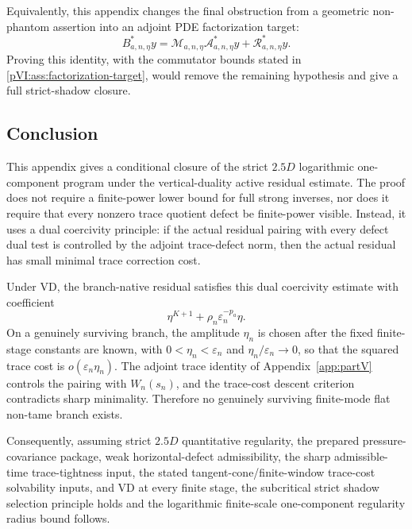 \documentclass[11pt]{article}
\numberwithin{equation}{section}
\theoremstyle{plain}
\theoremstyle{definition}
\theoremstyle{remark}
\newcommand{\eps}{\varepsilon}
\newcommand{\calA}{\mathcal A}
\newcommand{\calM}{\mathcal M}
\newcommand{\calR}{\mathcal R}
\begin{document}
Equivalently, this appendix changes the final obstruction from a geometric non-phantom assertion into
an adjoint PDE factorization target:
\[
        B_{a,n,\eta}^*y
        =
        \calM_{a,n,\eta}\calA_{a,n,\eta}^*y
        +
        \calR_{a,n,\eta}^*y.
\]
Proving this identity, with the commutator bounds stated in \cref{pVI:ass:factorization-target}, would
remove the remaining hypothesis and give a full strict-shadow closure.

\subsection{Conclusion}

This appendix gives a conditional closure of the strict \(2.5D\) logarithmic one-component program under
the vertical-duality active residual estimate.  The proof does not require a finite-power lower bound
for full strong inverses, nor does it require that every nonzero trace quotient defect be finite-power
visible.  Instead, it uses a dual coercivity principle: if the actual residual pairing with every defect
dual test is controlled by the adjoint trace-defect norm, then the actual residual has small minimal
trace correction cost.

Under VD, the branch-native residual satisfies this dual coercivity estimate with coefficient
\[
        \eta^{K+1}+\rho_n\eps_n^{-p_a}\eta.
\]
On a genuinely surviving branch, the amplitude \(\eta_n\) is chosen after the fixed finite-stage constants are known, with \(0<\eta_n<\eps_n\) and \(\eta_n/\eps_n\to0\), so that the
squared trace cost is \(o(\eps_n\eta_n)\).  The adjoint trace identity of Appendix~\ref{app:partV} controls the pairing
with \(W_n(s_n)\), and the trace-cost descent criterion contradicts sharp minimality.  Therefore no
genuinely surviving finite-mode flat non-tame branch exists.

Consequently, assuming strict \(2.5D\) quantitative regularity, the prepared pressure-covariance package, weak horizontal-defect admissibility, the sharp admissible-time trace-tightness input, the stated tangent-cone/finite-window trace-cost solvability inputs, and VD at every finite stage, the subcritical strict shadow selection principle holds and the logarithmic finite-scale one-component regularity radius bound follows.
\end{document}
